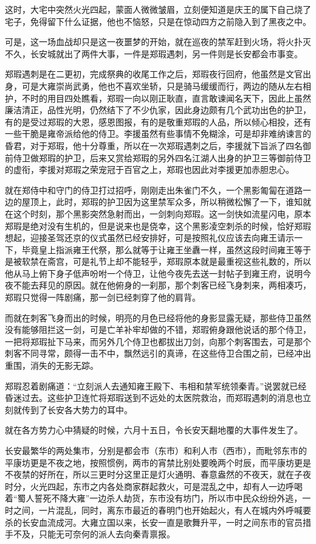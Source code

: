 这时，大宅中突然火光四起，蒙面人微微皱眉，立刻便知道是庆王的属下自己烧了宅子，免得留下什么证据，他也不恼怒，只是在惊动四方之前隐入到了黑夜之中。

可是，这一场血战却只是这一夜噩梦的开始，就在巡夜的禁军赶到火场，将火扑灭不久，长安城就出了两件大事，一件是郑瑕遇刺，另一件则是长安都会市事变。

郑瑕遇刺是在二更初，完成祭典的收尾工作之后，郑瑕夜行回府，他虽然是文官出身，可是大雍崇尚武勇，他也不喜欢坐轿，只是骑马缓缓而行，两边的随从左右相护，不时的用目四处瞧看，郑瑕一向以刚正耿直，直言敢谏闻名天下，因此上虽然廉洁清正，品性光明，仍然结下了不少仇家，因此身边颇有几个武功出色的护卫，有的是受过郑瑕的大恩，感恩图报，有的是敬重郑瑕的人品，所以倾心相投，还有一些干脆是雍帝派给他的侍卫。李援虽然有些事情不免糊涂，可是却非难纳谏言的昏君，对于郑瑕，他十分尊重，所以在一次郑瑕遇刺之后，李援就下旨派了四名御前侍卫做郑瑕的护卫，后来又赏给郑瑕的另外四名江湖人出身的护卫三等御前侍卫的虚衔，李援对郑瑕之荣宠冠于百官之上，郑瑕也因此对李援更加赤胆忠心。

就在郑侍中和守门的侍卫打过招呼，刚刚走出朱雀门不久，一个黑影匍匐在道路一边的屋顶上，此时，郑瑕的护卫因为这里禁军众多，所以稍微松懈了一下，谁知就在这个时刻，那个黑影突然急射而出，一剑刺向郑瑕。这一剑快如流星闪电，原本郑瑕是绝对没有生机的，但是说来也是侥幸，这个黑影凌空刺杀的时候，恰好郑瑕想起，迎接圣驾还京的仪式虽然已经安排好，可是按照礼仪应该去向雍王请示一下，毕竟皇上指派雍王代祭，那么就等于让雍王坐纛一样，虽然这段时间雍王等于是被软禁在斋宫，可是礼节上却不能轻乎，郑瑕原本就是最重视这些礼数的，所以他从马上俯下身子低声吩咐一个侍卫，让他今夜先去送一封帖子到雍王府，说明今夜不能去拜见的原因。就在他俯身的一刹那，那个刺客已经飞身刺来，两相凑巧，郑瑕只觉得一阵剧痛，那一剑已经刺穿了他的肩背。

而就在刺客飞身而出的时候，明亮的月色已经将他的身影显露无疑，那些侍卫虽然没有能够阻拦这一剑，可是亡羊补牢却做的不错，郑瑕俯身跟他说话的那个侍卫，一把将郑瑕扯下马来，而另外几个侍卫也都拔出刀剑，向那个刺客围去，可是那个刺客不同寻常，颇得一击不中，飘然远引的真谛，在这些侍卫合围之前，已经冲出重围，消失的无影无踪。

郑瑕忍着剧痛道：“立刻派人去通知雍王殿下、韦相和禁军统领秦青。”说罢就已经昏迷过去。这些护卫连忙将郑瑕送到不远处的太医院救治，而郑瑕遇刺的消息也立刻就传到了长安各大势力的耳中。

就在各方势力心中猜疑的时候，六月十五日，令长安天翻地覆的大事件发生了。

长安最繁华的两处集市，分别是都会市（东市）和利人市（西市），而毗邻东市的平康坊更是不夜之地，按照惯例，两市的宵禁比别处要晚两个时辰，而平康坊更是不夜禁的好所在，所以三更时分这里正是灯火通明、春意盎然的不夜天，就在子夜时分，火光四起，东市之内各处商家群起救火，可是混乱之中，却有人一边呼喝着“蜀人誓死不降大雍”一边杀人劫货，东市没有坊门，所以市中民众纷纷外逃，一时之间，一片混乱，同时，离东市最近的春明门也开始起火，有人在城内外呼喊要杀的长安血流成河。大雍立国以来，长安一直是歌舞升平，一时之间东市的官员措手不及，只能无可奈何的派人去向秦青禀报。

